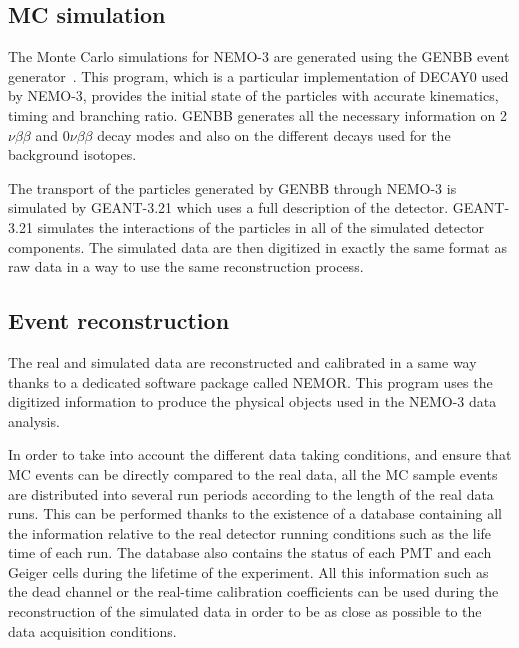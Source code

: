 \documentclass[main.tex]{subfiles}
\begin{document}
\subsection{MC simulation}\label{sec:MCsimu}


\NI The Monte Carlo simulations for NEMO-3 are generated using the GENBB event generator~\cite{GENBB}. This program, which is a particular implementation of DECAY0 used by NEMO-3, provides the initial state of the particles with accurate kinematics, timing and branching ratio. GENBB generates all the necessary information on 2$\nu\beta\beta$ and 0$\nu\beta\beta$ decay modes and also on the different decays used for the background isotopes.


\bigskip


\NI The transport of the particles generated by GENBB through NEMO-3 is simulated by GEANT-3.21 \cite{GEANT3} which uses a full description of the detector. GEANT-3.21 simulates the interactions of the particles in all of the simulated detector components. The simulated data are then digitized in exactly the same format as raw data in a way to use the same reconstruction process.   


\subsection{Event reconstruction}\label{sec:RecoNEMOR}


\NI The real and simulated data are reconstructed and calibrated in a same way thanks to a dedicated software package called NEMOR. This program uses the digitized information to produce the physical objects used in the NEMO-3 data analysis. 


\bigskip


\NI In order to take into account the different data taking conditions, and ensure that MC events can be directly compared to the real data, all the MC sample events are distributed into several run periods according to the length of the real data runs.  This can be performed thanks to the existence of a database containing all the information relative to the real detector running conditions such as the life time of each run. The database also contains the status of each PMT and each Geiger cells during the lifetime of the experiment. All this information such as the dead channel or the real-time calibration coefficients can be used during the reconstruction of the simulated data in order to be as close as possible to the data acquisition conditions.  
\end{document}

